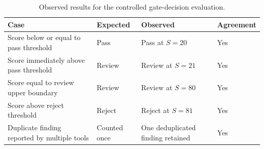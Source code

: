 \begin{table}[ht]
\centering
\small
\caption{Observed results for the controlled gate-decision evaluation.}
\label{tab:rq3-gate-results-frame}
\begin{tabular}{|L{4.6cm}|C{2.5cm}|C{2.5cm}|C{2.7cm}|}
\hline
\textbf{Case} & \textbf{Expected} & \textbf{Observed} & \textbf{Agreement} \\
\hline
Score below or equal to pass threshold & Pass & Pass at $S=20$ & Yes \\
\hline
Score immediately above pass threshold & Review & Review at $S=21$ & Yes \\
\hline
Score equal to review upper boundary & Review & Review at $S=80$ & Yes \\
\hline
Score above reject threshold & Reject & Reject at $S=81$ & Yes \\
\hline
Duplicate finding reported by multiple tools & Counted once & One deduplicated finding retained & Yes \\
\hline
\end{tabular}
\end{table}
